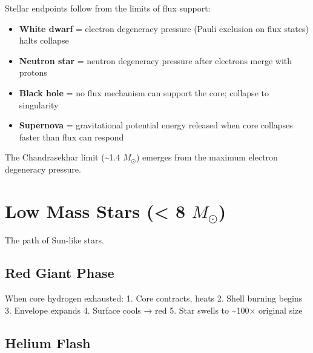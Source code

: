 \documentclass[
  11pt,
  letterpaper,
  twoside,
  openright]{book}
\providecommand{\tightlist}{%
  \setlength{\itemsep}{0pt}\setlength{\parskip}{0pt}}
\begin{document}
\begin{tcolorbox}[enhanced jigsaw, leftrule=.75mm, title=\textcolor{quarto-callout-note-color}{\faInfo}\hspace{0.5em}{How FTD Produces Stellar Death}, bottomrule=.15mm, opacityback=0, coltitle=black, arc=.35mm, colframe=quarto-callout-note-color-frame, colbacktitle=quarto-callout-note-color!10!white, colback=white, titlerule=0mm, breakable, bottomtitle=1mm, toptitle=1mm, rightrule=.15mm, toprule=.15mm, left=2mm, opacitybacktitle=0.6]

Stellar endpoints follow from the limits of flux support:

\begin{itemize}
\tightlist
\item
  \textbf{White dwarf} = electron degeneracy pressure (Pauli exclusion
  on flux states) halts collapse
\item
  \textbf{Neutron star} = neutron degeneracy pressure after electrons
  merge with protons
\item
  \textbf{Black hole} = no flux mechanism can support the core; collapse
  to singularity
\item
  \textbf{Supernova} = gravitational potential energy released when core
  collapses faster than flux can respond
\end{itemize}

The Chandrasekhar limit (\textasciitilde1.4 \(M_\odot\)) emerges from
the maximum electron degeneracy pressure.

\end{tcolorbox}

\section{\texorpdfstring{Low Mass Stars (\textless{} 8
\(M_\odot\))}{Low Mass Stars (\textless{} 8 M\_\textbackslash odot)}}\label{low-mass-stars-8-m_odot}

The path of Sun-like stars.

\subsection{Red Giant Phase}\label{red-giant-phase}

When core hydrogen exhausted: 1. Core contracts, heats 2. Shell burning
begins 3. Envelope expands 4. Surface cools → red 5. Star swells to
\textasciitilde100× original size

\subsection{Helium Flash}\label{helium-flash}
\end{document}
